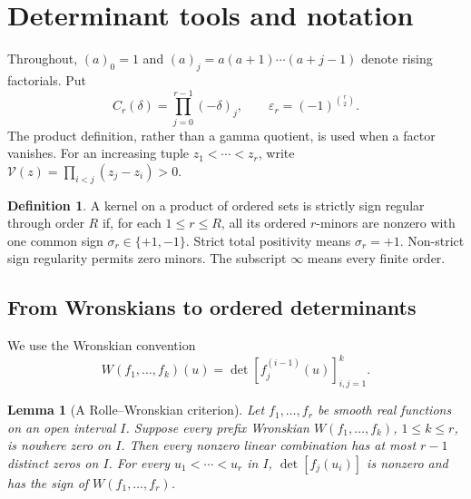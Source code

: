 \documentclass[11pt,a4paper]{article}
\newtheorem{lemma}[theorem]{Lemma}
\theoremstyle{definition}
\newtheorem{definition}[theorem]{Definition}
\theoremstyle{remark}
\newcommand{\ep}{\varepsilon}
\newcommand{\V}{\mathcal V}
\begin{document}
\section{Determinant tools and notation}

Throughout, \((a)_0=1\) and
\((a)_j=a(a+1)\cdots(a+j-1)\) denote rising factorials. Put
\begin{equation}\label{eq:sign-product}
 C_r(\delta)=\prod_{j=0}^{r-1}(-\delta)_j,
 \qquad \ep_r=(-1)^{\binom r2}.
\end{equation}
The product definition, rather than a gamma quotient, is used when a factor
vanishes. For an increasing tuple \(z_1<\cdots<z_r\), write
\(\V(z)=\prod_{i<j}(z_j-z_i)>0\).

\begin{definition}
A kernel on a product of ordered sets is strictly sign regular through
order \(R\) if, for each \(1\le r\le R\), all its ordered \(r\)-minors
are nonzero with one common sign \(\sigma_r\in\{+1,-1\}\).
Strict total positivity means \(\sigma_r=+1\). Non-strict sign regularity
permits zero minors. The subscript \(\infty\) means every finite order.
\end{definition}

\subsection{From Wronskians to ordered determinants}


We use the Wronskian convention
\[
 W(f_1,\ldots,f_k)(u)
 =\det[f_j^{(i-1)}(u)]_{i,j=1}^{k}.
\]

\begin{lemma}[A Rolle--Wronskian criterion]\label{lem:rolle}
Let \(f_1,\ldots,f_r\) be smooth real functions on an open interval \(I\).
Suppose every prefix Wronskian
\(W(f_1,\ldots,f_k)\), \(1\le k\le r\), is nowhere zero on \(I\).
Then every nonzero linear combination has at most \(r-1\) distinct zeros
on \(I\). For every \(u_1<\cdots<u_r\) in \(I\),
\(\det[f_j(u_i)]\) is nonzero and has the sign of
\(W(f_1,\ldots,f_r)\).
\end{lemma}
\end{document}
